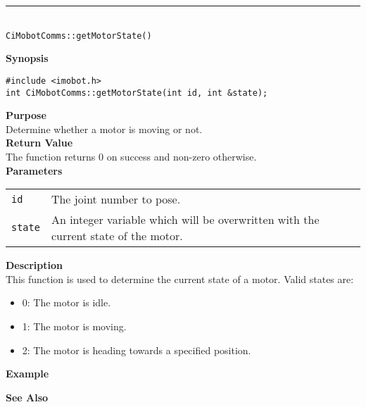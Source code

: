 \noindent
\vspace{5pt}
\rule{4.5in}{0.015in}\\
\noindent
{\LARGE \texttt{CiMobotComms::getMotorState()}}\\
{}

\noindent
{\bf Synopsis}\\
\begin{verbatim}
#include <imobot.h>
int CiMobotComms::getMotorState(int id, int &state);
\end{verbatim}

\noindent
{\bf Purpose}\\
Determine whether a motor is moving or not.\\

\noindent
{\bf Return Value}\\
The function returns 0 on success and non-zero otherwise.\\

\noindent
{\bf Parameters}
\vspace{-0.1in}
\begin{description}
\item               
\begin{tabular}{p{10 mm}p{145 mm}}
\texttt{id} & The joint number to pose. \\
\texttt{state} & An integer variable which will be overwritten with the current state of the motor. 
\end{tabular}
\end{description}

\noindent
{\bf Description}\\
This function is used to determine the current state of a motor. Valid states are:
\begin{itemize}
\item 0: The motor is idle.
\item 1: The motor is moving.
\item 2: The motor is heading towards a specified position.
\end{itemize}

\noindent
{\bf Example}\\
\noindent

\noindent
{\bf See Also}\\

